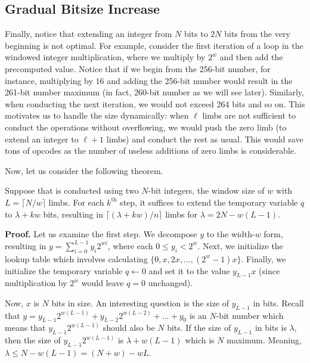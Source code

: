 \documentclass{iacrtrans}
\begin{document}
\subsection{Gradual Bitsize Increase}\label{section:size_increase}

Finally, notice that extending an integer from $N$ bits to $2N$ bits from the very beginning is not optimal. For example, consider the first iteration of a loop in the windowed integer multiplication, where we multiply by $2^w$ and then add the precomputed value. Notice that if we begin from the 256-bit number, for instance, multiplying by $16$ and adding the 256-bit number would result in the 261-bit number maximum (in fact, 260-bit number as we will see later). Similarly, when conducting the next iteration, we would not exceed 264 bits and so on. This motivates us to handle the size dynamically: when $\ell$ limbs are not sufficient to conduct the operations without overflowing, we would push the zero limb (to extend an integer to $\ell+1$ limbs) and conduct the rest as usual. This would save tons of opcodes as the number of useless additions of zero limbs is considerable. 

Now, let us consider the following theorem.

\begin{theorem}\label{theorem:gradual_increase}
    Suppose that  is conducted using two $N$-bit integers, the window size of $w$ with $L=\lceil N/w \rceil$ limbs. For each $k^{\text{th}}$ step, it suffices to extend the temporary variable $q$ to $\lambda+kw$ bits, resulting in $\lceil (\lambda+kw)/n \rceil$ limbs for $\lambda = 2N - w(L-1)$.
\end{theorem}

\textbf{Proof.} Let us examine the first step. We decompose $y$ to the width-$w$ form, resulting in $y = \sum_{i=0}^{L-1}y_i2^{wi}$, where each $0 \leq y_i < 2^w$. Next, we initialize the lookup table which involves calculating $\{0,x,2x,\dots,(2^w-1)x\}$. Finally, we initialize the temporary variable $q \gets 0$ and set it to the value $y_{L-1}x$ (since multiplication by $2^w$ would leave $q=0$ unchanged). 

Now, $x$ is $N$ bits in size. An interesting question is the size of $y_{L-1}$ in bits. Recall that $y=y_{L-1}2^{w(L-1)}+y_{L-2}2^{w(L-2)}+\dots+y_0$ is an $N$-bit number which means that $y_{L-1}2^{w(L-1)}$ should also be $N$ bits. If the size of $y_{L-1}$ in bits is $\lambda$, then the size of $y_{L-1}2^{w(L-1)}$ is $\lambda+w(L-1)$ which is $N$ maximum. Meaning, $\lambda \leq N - w(L-1) = (N+w) - wL$. 
\end{document}
